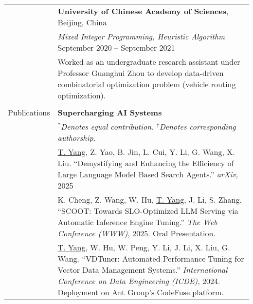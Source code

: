 \documentclass[letterpaper, 10pt]{article}
\begin{document}
\begin{longtable}{p{}p{}}
& \textbf{University of Chinese Academy of Sciences}, Beijing, China \\ 
& \textit{Mixed Integer Programming, Heuristic Algorithm} \hfill September 2020 -- September 2021 \\
&  Worked as an undergraduate research assistant under Professor Guanghui Zhou to develop data-driven combinatorial optimization problem (vehicle routing optimization). \\
& \\




\nohyphens{\textcolor{OliveGreen}{Publications}} 
& \textbf{Supercharging AI Systems} 
\vspace{0.01\textwidth} \\

& \textit{$^*$Denotes equal contribution. $^\dagger$Denotes corresponding authorship.} 
\vspace{0.01\textwidth} \\

& \underline{T. Yang}, Z. Yao, B. Jin, L. Cui, Y. Li, G. Wang, X. Liu. \enquote{Demystifying and Enhancing the Efficiency of Large Language Model Based Search Agents.} \textit{arXiv}, 2025
\vspace{0.01\textwidth} \\

& K. Cheng, Z. Wang, W. Hu, \underline{T. Yang}, J. Li, S. Zhang. \enquote{SCOOT: Towards SLO-Optimized LLM Serving via Automatic Inference Engine Tuning.} \textit{The Web Conference (WWW)}, 2025. \textcolor[RGB]{200, 0, 0}{Oral Presentation.}
\vspace{0.01\textwidth} \\

& \underline{T. Yang}, W. Hu, W. Peng, Y. Li, J. Li, X. Liu, G. Wang. \enquote{VDTuner: Automated Performance Tuning for Vector Data Management Systems.} \textit{International Conference on Data Engineering (ICDE)}, 2024. \textcolor[RGB]{200, 0, 0}{Deployment on Ant Group's CodeFuse platform.}
\vspace{0.01\textwidth} \\


\end{longtable}
\end{document}
